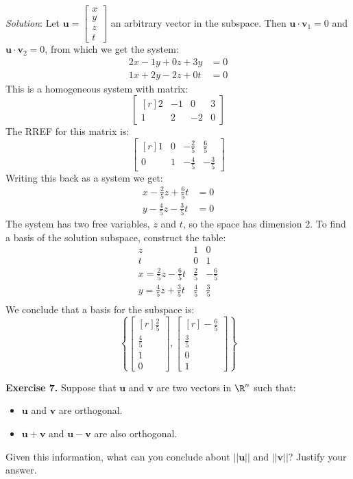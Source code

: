 \documentclass[12pt]{article}
\begin{document}
\emph{Solution}: Let $\mathbf{u}=\begin{bmatrix}x\\y\\z\\t\end{bmatrix}$ an arbitrary vector in the subspace. Then $\mathbf{u}\cdot\mathbf{v}_1=0$ and $\mathbf{u}\cdot\mathbf{v}_2=0$,
from which we get the system:
\begin{align*}
2x-1y+0z+3y&=0\\
1x+2y-2z+0t&=0
\end{align*}
This is a homogeneous system with matrix:
\[
\left[\begin{matrix*}[r]2 & -1 & 0 & 3\\1 & 2 & -2 & 0\end{matrix*}\right]
\]
The RREF for this matrix is:
\[
\left[\begin{matrix*}[r]1 & 0 & - \frac{2}{5} & \frac{6}{5}\\0 & 1 & - \frac{4}{5} & - \frac{3}{5}\end{matrix*}\right]
\]
Writing this back as a system we get:
\begin{align*}
x-\frac{2}{5}z+\frac{6}{5}t&=0\\
y-\frac{4}{5}z-\frac{3}{5}t&=0
\end{align*}
The system has two free variables, $z$ and $t$, so the space has dimension 2. To find a basis of the solution subspace, construct the table:
\[
\begin{array}{l|rr}
z & 1 & 0\\
t & 0 & 1\\
x=\frac{2}{5}z-\frac{6}{5}t & \frac{2}{5} & -\frac{6}{5}\\
y=\frac{4}{5}z+\frac{3}{5}t & \frac{4}{5} &  \frac{3}{5}\\
\end{array}
\]
We conclude that a basis for the subspace is:
\[
\left\{
\begin{bmatrix*}[r]\frac{2}{5}\\\frac{4}{5}\\1\\0\end{bmatrix*},
\begin{bmatrix*}[r]-\frac{6}{5}\\\frac{3}{5}\\0\\1\end{bmatrix*}
\right\}
\]
\proofend

\bigskip
\textbf{Exercise 7.} Suppose that $\mathbf{u}$ and $\mathbf{v}$ are two vectors in $\R^n$ such that:
\begin{itemize}
\item $\mathbf{u}$ and $\mathbf{v}$ are orthogonal.
\item $\mathbf{u}+\mathbf{v}$ and $\mathbf{u}-\mathbf{v}$ are also orthogonal.
\end{itemize}
Given this information, what can you conclude about $||\mathbf{u}||$ and $||\mathbf{v}||$? Justify your answer.
\end{document}
